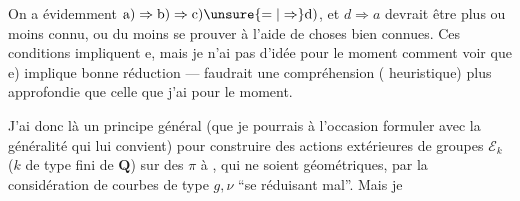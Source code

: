 On a évidemment $\mathrm{a)}\Rightarrow\mathrm{b)}\Rightarrow\mathrm{c)}\unsure{=|\Rightarrow}\mathrm{d)}$, et $d\Rightarrow a$ devrait être plus ou moins connu, ou du moins se prouver à l'aide de choses bien connues. Ces conditions impliquent e, mais je n'ai pas d'idée pour le moment comment voir que e) implique bonne réduction --- faudrait une compréhension ( heuristique) plus approfondie que celle que j'ai pour le moment.

J'ai donc là un principe général (que je pourrais à l'occasion formuler avec la généralité qui lui convient) pour construire des actions extérieures  de groupes $\mathcal E_k$ ($k$  de type fini de $\mathbf Q$) sur des $\pi$ à , qui  ne soient géométriques, par  la considération de courbes de type $g,\nu$ ``se réduisant mal''. Mais je 

